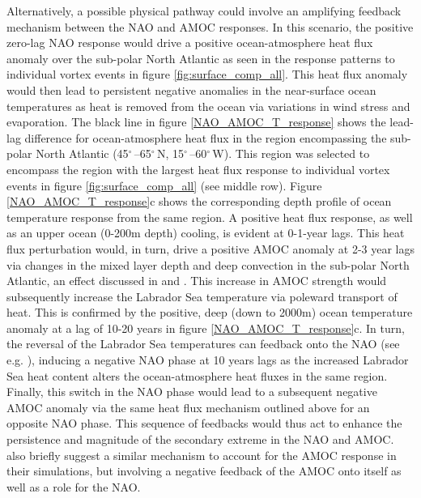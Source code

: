 Alternatively, a possible physical pathway could involve an amplifying feedback mechanism between the NAO and AMOC responses. In this scenario, the positive zero-lag NAO response would drive a positive ocean-atmosphere heat flux anomaly over the sub-polar North Atlantic as seen in the response patterns to individual vortex events in figure \ref{fig:surface_comp_all}. This heat flux anomaly would then lead to persistent negative anomalies in the near-surface ocean temperatures as heat is removed from the ocean via variations in wind stress and evaporation. The black line in figure \ref{NAO_AMOC_T_response} shows the lead-lag difference for ocean-atmosphere heat flux in the region encompassing the sub-polar North Atlantic (45$^{\circ}$\,–65$^{\circ}$\,N, 15$^{\circ}$\,–60$^{\circ}$\,W). This region was selected to encompass the region with the largest heat flux response to individual vortex events in figure \ref{fig:surface_comp_all} (see middle row). Figure \ref{NAO_AMOC_T_response}c shows the corresponding depth profile of ocean temperature response from the same region. A positive heat flux response, as well as an upper ocean (0-200m depth) cooling, is evident at 0-1-year lags. This heat flux perturbation would, in turn, drive a positive AMOC anomaly at 2-3 year lags via changes in the mixed layer depth and deep convection in the sub-polar North Atlantic, an effect discussed in \cite{delworthInterdecadal1993b} and \cite{medhaugMechanisms2012b}. This increase in AMOC strength would subsequently increase the Labrador Sea temperature via poleward transport of heat. This is confirmed by the positive, deep (down to 2000m) ocean temperature anomaly at a lag of 10-20 years in figure \ref{NAO_AMOC_T_response}c. In turn, the reversal of the Labrador Sea temperatures can feedback onto the NAO (see e.g. \cite{frankignoulInfluence2013b}), inducing a negative NAO phase at 10 years lags as the increased Labrador Sea heat content alters the ocean-atmosphere heat fluxes in the same region. Finally, this switch in the NAO phase would lead to a subsequent negative AMOC anomaly via the same heat flux mechanism outlined above for an opposite NAO phase. This sequence of feedbacks would thus act to enhance the persistence and magnitude of the secondary extreme in the NAO and AMOC. \cite{reichlerStratospheric2012b} also briefly suggest a similar mechanism to account for the AMOC response in their simulations, but involving a negative feedback of the AMOC onto itself as well as a role for the NAO. 

